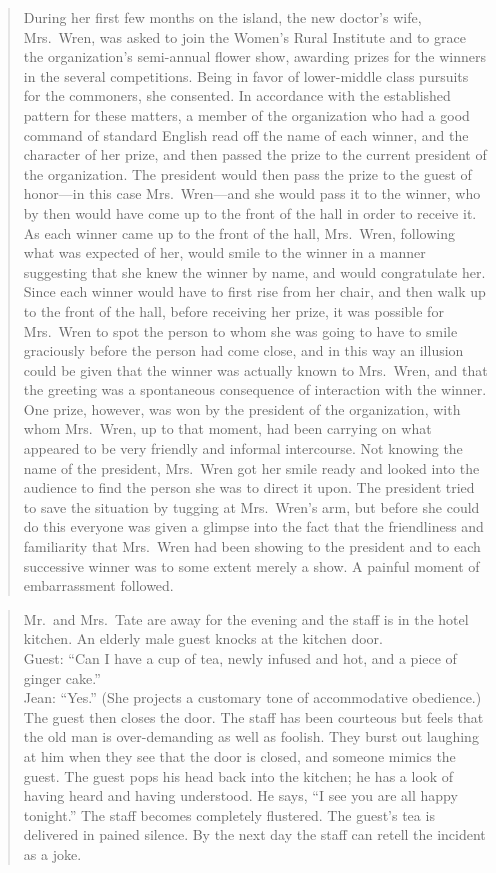 \documentclass[openany,nobib]{tufte-book}
\begin{document}
\begin{quote}
During her first few months on the island, the new doctor's wife,
Mrs.~Wren, was asked to join the Women's Rural Institute and to grace
the organization's semi-annual flower show, awarding prizes for the
winners in the several competitions. Being in favor of lower-middle
class pursuits for the commoners, she consented. In accordance with the
established pattern for these matters, a member of the organization who
had a good command of standard English read off the name of each winner,
and the character of her prize, and then passed the prize to the current
president of the organization. The president would then pass the prize
to the guest of honor---in this case Mrs.~Wren---and she would pass it
to the winner, who by then would have come up to the front of the hall
in order to receive it. As each winner came up to the front of the hall,
Mrs.~Wren, following what was expected of her, would smile to the winner
in a manner suggesting that she knew the winner by name, and would
congratulate her. Since each winner would have to first rise from her
chair, and then walk up to the front of the hall, before receiving her
prize, it was possible for Mrs.~Wren to spot the person to whom she was
going to have to smile graciously before the person had come close, and
in this way an illusion could be given that the winner was actually
known to Mrs.~Wren, and that the greeting was a spontaneous consequence
of interaction with the winner. One prize, however, was won by the
president of the organization, with whom Mrs.~Wren, up to that moment,
had been carrying on what appeared to be very friendly and informal
intercourse. Not knowing the name of the president, Mrs.~Wren got her
smile ready and looked into the audience to find the person she was to
direct it upon. The president tried to save the situation by tugging at
Mrs.~Wren's arm, but before she could do this everyone was given a
glimpse into the fact that the friendliness and familiarity that
Mrs.~Wren had been showing to the president and to each successive
winner was to some extent merely a show. A painful moment of
embarrassment followed.
\end{quote}

\begin{quote}
Mr.~and Mrs.~Tate are away for the evening and the staff is in the hotel
kitchen. An elderly male guest knocks at the kitchen door.\\
Guest: ``Can I have a cup of tea, newly infused and hot, and a piece of
ginger cake.''\\
Jean: ``Yes.'' (She projects a customary tone of accommodative
obedience.)\\
The guest then closes the door. The staff has been courteous but feels
that the old man is over-demanding as well as foolish. They burst out
laughing at him when they see that the door is closed, and someone
mimics the guest. The guest pops his head back into the kitchen; he has
a look of having heard and having understood. He says, ``I see you are
all happy tonight.'' The staff becomes completely flustered. The guest's
tea is delivered in pained silence. By the next day the staff can retell
the incident as a joke.
\end{quote}
\end{document}
